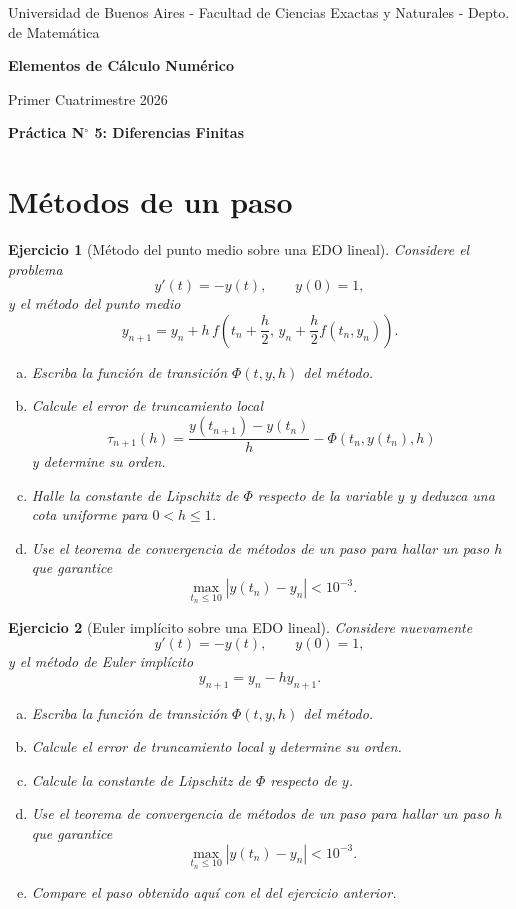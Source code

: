 \documentclass[12pt]{article}
\newtheorem{exercise}{Ejercicio}
\begin{document}
\centerline{{\small Universidad de Buenos Aires - Facultad de Ciencias Exactas y Naturales - Depto. de Matemática}}

 \vskip 0.2cm
 \hrulefill
 \vskip 0.2cm

 \centerline{{\bf\Huge {\sc Elementos de Cálculo Numérico}}}
 \vskip 0.2cm
 \centerline{\ttfamily Primer Cuatrimestre 2026}
 \hrulefill

 \bigskip
 \centerline{\bf Práctica N$^\circ$ 5: Diferencias Finitas}
 \bigskip

\section*{Métodos de un paso}

\begin{exercise}[Método del punto medio sobre una EDO lineal]
Considere el problema
\[
  y'(t)=-y(t),\qquad y(0)=1,
\]
y el método del punto medio
\[
  y_{n+1}=y_n+h\,f\!\left(t_n+\frac{h}{2},\,y_n+\frac{h}{2}f(t_n,y_n)\right).
\]
\begin{enumerate}[(a)]
\item Escriba la función de transición $\Phi(t,y,h)$ del método.
\item Calcule el error de truncamiento local
\[
  \tau_{n+1}(h)=\frac{y(t_{n+1})-y(t_n)}{h}-\Phi(t_n,y(t_n),h)
\]
y determine su orden.
\item Halle la constante de Lipschitz de $\Phi$ respecto de la variable $y$ y deduzca una cota uniforme para $0<h\le 1$.
\item Use el teorema de convergencia de métodos de un paso para hallar un paso $h$ que garantice
\[
  \max_{t_n\le 10}|y(t_n)-y_n|<10^{-3}.
\]
\end{enumerate}
\end{exercise}

\begin{exercise}[Euler implícito sobre una EDO lineal]
Considere nuevamente
\[
  y'(t)=-y(t),\qquad y(0)=1,
\]
y el método de Euler implícito
\[
  y_{n+1}=y_n-hy_{n+1}.
\]
\begin{enumerate}[(a)]
\item Escriba la función de transición $\Phi(t,y,h)$ del método.
\item Calcule el error de truncamiento local y determine su orden.
\item Calcule la constante de Lipschitz de $\Phi$ respecto de $y$.
\item Use el teorema de convergencia de métodos de un paso para hallar un paso $h$ que garantice
\[
  \max_{t_n\le 10}|y(t_n)-y_n|<10^{-3}.
\]
\item Compare el paso obtenido aquí con el del ejercicio anterior.
\end{enumerate}
\end{exercise}
\end{document}
